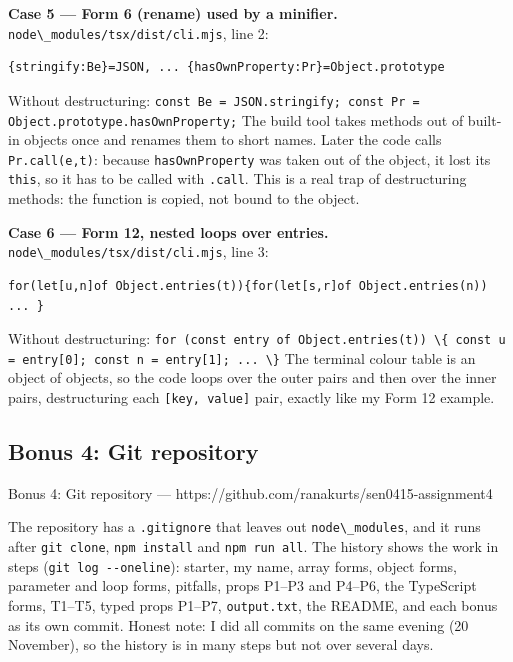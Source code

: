 \documentclass[
  10pt,
]{article}
\newcommand{\passthrough}[1]{#1}
\begin{document}
\textbf{Case 5 --- Form 6 (rename) used by a minifier.}
\passthrough{\lstinline!node\_modules/tsx/dist/cli.mjs!}, line 2:

\begin{lstlisting}
{stringify:Be}=JSON, ... {hasOwnProperty:Pr}=Object.prototype
\end{lstlisting}

Without destructuring:
\passthrough{\lstinline!const Be = JSON.stringify; const Pr = Object.prototype.hasOwnProperty;!}
The build tool takes methods out of built-in objects once and renames
them to short names. Later the code calls
\passthrough{\lstinline!Pr.call(e,t)!}: because
\passthrough{\lstinline!hasOwnProperty!} was taken out of the object, it
lost its \passthrough{\lstinline!this!}, so it has to be called with
\passthrough{\lstinline!.call!}. This is a real trap of destructuring
methods: the function is copied, not bound to the object.

\textbf{Case 6 --- Form 12, nested loops over entries.}
\passthrough{\lstinline!node\_modules/tsx/dist/cli.mjs!}, line 3:

\begin{lstlisting}
for(let[u,n]of Object.entries(t)){for(let[s,r]of Object.entries(n)) ... }
\end{lstlisting}

Without destructuring:
\passthrough{\lstinline!for (const entry of Object.entries(t)) \{ const u = entry[0]; const n = entry[1]; ... \}!}
The terminal colour table is an object of objects, so the code loops
over the outer pairs and then over the inner pairs, destructuring each
\passthrough{\lstinline![key, value]!} pair, exactly like my Form 12
example.

\hypertarget{bonus-4-git-repository}{%
\subsection{Bonus 4: Git repository}\label{bonus-4-git-repository}}

Bonus 4: Git repository ---
https://github.com/ranakurts/sen0415-assignment4

The repository has a \passthrough{\lstinline!.gitignore!} that leaves
out \passthrough{\lstinline!node\_modules!}, and it runs after
\passthrough{\lstinline!git clone!},
\passthrough{\lstinline!npm install!} and
\passthrough{\lstinline!npm run all!}. The history shows the work in
steps (\passthrough{\lstinline!git log --oneline!}): starter, my name,
array forms, object forms, parameter and loop forms, pitfalls, props
P1--P3 and P4--P6, the TypeScript forms, T1--T5, typed props P1--P7,
\passthrough{\lstinline!output.txt!}, the README, and each bonus as its
own commit. Honest note: I did all commits on the same evening (20
November), so the history is in many steps but not over several days.
\end{document}
